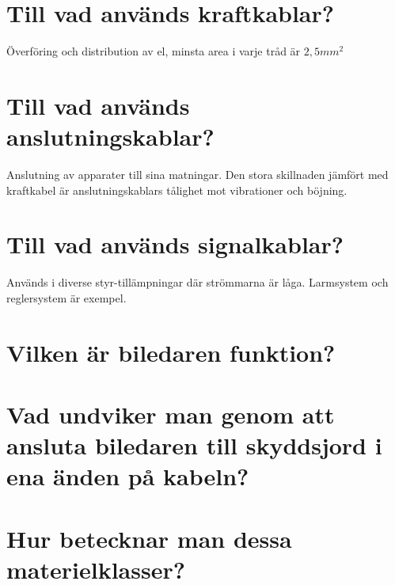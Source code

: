 \documentclass[a4paper,swedish]{article}
\begin{document}
\setcounter{section}{22}
\section{Till vad används kraftkablar?}

Överföring och distribution av el, minsta area i varje tråd är $2,5 mm^2$
\setcounter{section}{24}
\section{Till vad används anslutningskablar?}

Anslutning av apparater till sina matningar. Den stora skillnaden jämfört med kraftkabel är anslutningskablars
tålighet mot vibrationer och böjning.

\setcounter{section}{26}
\section{Till vad används signalkablar?}

Används i diverse styr-tillämpningar där strömmarna är låga.
Larmsystem och reglersystem är exempel.

\setcounter{section}{28}
\section{Vilken är biledaren funktion?}

\setcounter{section}{30}
\section{Vad undviker man genom att ansluta biledaren till skyddsjord i ena änden på
kabeln?}

\setcounter{section}{32}
\section{Hur betecknar man dessa materielklasser?}
\end{document}
